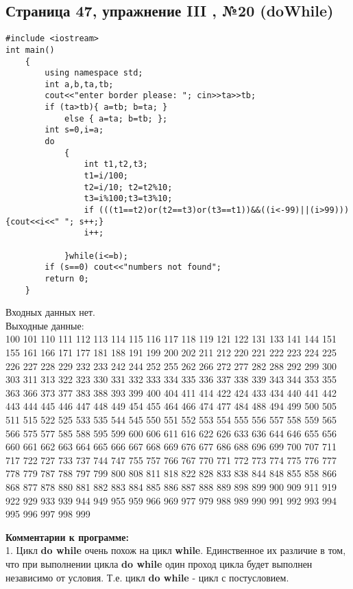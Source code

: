 \documentclass[11pt]{article}
\begin{document}
\begin{flushleft}
\newpage
\begin{center}
\section{Страница 47, упражнение III , №20 (doWhile)}
\end{center}
\begin{lstlisting}
#include <iostream>
int main()
	{
		using namespace std;
		int a,b,ta,tb;
		cout<<"enter border please: "; cin>>ta>>tb;
		if (ta>tb){ a=tb; b=ta; }
			else { a=ta; b=tb; };
		int s=0,i=a;
		do
			{
				int t1,t2,t3;
				t1=i/100;
				t2=i/10; t2=t2%10;
				t3=i%100;t3=t3%10;
				if (((t1==t2)or(t2==t3)or(t3==t1))&&((i<-99)||(i>99))) {cout<<i<<" "; s++;}
				i++;

			}while(i<=b);
		if (s==0) cout<<"numbers not found";
		return 0;
	}
\end{lstlisting}

\begin{center}Входных данных нет.\\ Выходные данные:\\
100 101 110 111 112 113 114 115 116 117 118 119 121 122 131 133 141 144 151 155 161 166 171 177 181 188 191 199 200 202 211 212 220 221 222 223 224 225 226 227 228 229 232 233 242 244 252 255 262 266 272 277 282 288 292 299 300 303 311 313 322 323 330 331 332 333 334 335 336 337 338 339 343 344 353 355 363 366 373 377 383 388 393 399 400 404 411 414 422 424 433 434 440 441 442 443 444 445 446 447 448 449 454 455 464 466 474 477 484 488 494 499 500 505 511 515 522 525 533 535 544 545 550 551 552 553 554 555 556 557 558 559 565 566 575 577 585 588 595 599 600 606 611 616 622 626 633 636 644 646 655 656 660 661 662 663 664 665 666 667 668 669 676 677 686 688 696 699 700 707 711 717 722 727 733 737 744 747 755 757 766 767 770 771 772 773 774 775 776 777 778 779 787 788 797 799 800 808 811 818 822 828 833 838 844 848 855 858 866 868 877 878 880 881 882 883 884 885 886 887 888 889 898 899 900 909 911 919 922 929 933 939 944 949 955 959 966 969 977 979 988 989 990 991 992 993 994 995 996 997 998 999 \end{center}

\textbf{Комментарии к программе:} \\
1. Цикл \textbf{do while} очень похож на цикл \textbf{while}. Единственное их различие в том, что при выполнении цикла \textbf{do while} один проход цикла будет выполнен независимо от условия.  Т.е. цикл \textbf{do while} - цикл с постусловием.


\end{flushleft}
\end{document}
